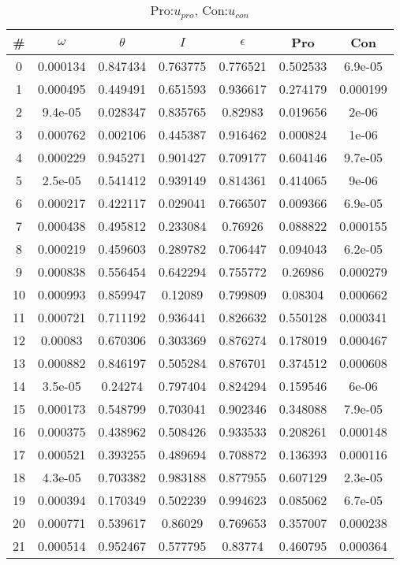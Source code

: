 \begin{table}
\caption{Pro:$u_{pro}$, Con:$u_{con}$}
\begin{tabular}{c|c|c|c|c|c|c}
\# & $\omega$ & $\theta$ & $I$ & $\epsilon$ & Pro & Con\\
\hline
0 & 0.000134 & 0.847434 & 0.763775 & 0.776521 & 0.502533 & 6.9e-05\\
1 & 0.000495 & 0.449491 & 0.651593 & 0.936617 & 0.274179 & 0.000199\\
2 & 9.4e-05 & 0.028347 & 0.835765 & 0.82983 & 0.019656 & 2e-06\\
3 & 0.000762 & 0.002106 & 0.445387 & 0.916462 & 0.000824 & 1e-06\\
4 & 0.000229 & 0.945271 & 0.901427 & 0.709177 & 0.604146 & 9.7e-05\\
5 & 2.5e-05 & 0.541412 & 0.939149 & 0.814361 & 0.414065 & 9e-06\\
6 & 0.000217 & 0.422117 & 0.029041 & 0.766507 & 0.009366 & 6.9e-05\\
7 & 0.000438 & 0.495812 & 0.233084 & 0.76926 & 0.088822 & 0.000155\\
8 & 0.000219 & 0.459603 & 0.289782 & 0.706447 & 0.094043 & 6.2e-05\\
9 & 0.000838 & 0.556454 & 0.642294 & 0.755772 & 0.26986 & 0.000279\\
10 & 0.000993 & 0.859947 & 0.12089 & 0.799809 & 0.08304 & 0.000662\\
11 & 0.000721 & 0.711192 & 0.936441 & 0.826632 & 0.550128 & 0.000341\\
12 & 0.00083 & 0.670306 & 0.303369 & 0.876274 & 0.178019 & 0.000467\\
13 & 0.000882 & 0.846197 & 0.505284 & 0.876701 & 0.374512 & 0.000608\\
14 & 3.5e-05 & 0.24274 & 0.797404 & 0.824294 & 0.159546 & 6e-06\\
15 & 0.000173 & 0.548799 & 0.703041 & 0.902346 & 0.348088 & 7.9e-05\\
16 & 0.000375 & 0.438962 & 0.508426 & 0.933533 & 0.208261 & 0.000148\\
17 & 0.000521 & 0.393255 & 0.489694 & 0.708872 & 0.136393 & 0.000116\\
18 & 4.3e-05 & 0.703382 & 0.983188 & 0.877955 & 0.607129 & 2.3e-05\\
19 & 0.000394 & 0.170349 & 0.502239 & 0.994623 & 0.085062 & 6.7e-05\\
20 & 0.000771 & 0.539617 & 0.86029 & 0.769653 & 0.357007 & 0.000238\\
21 & 0.000514 & 0.952467 & 0.577795 & 0.83774 & 0.460795 & 0.000364\\

\end{tabular}
\end{table}
